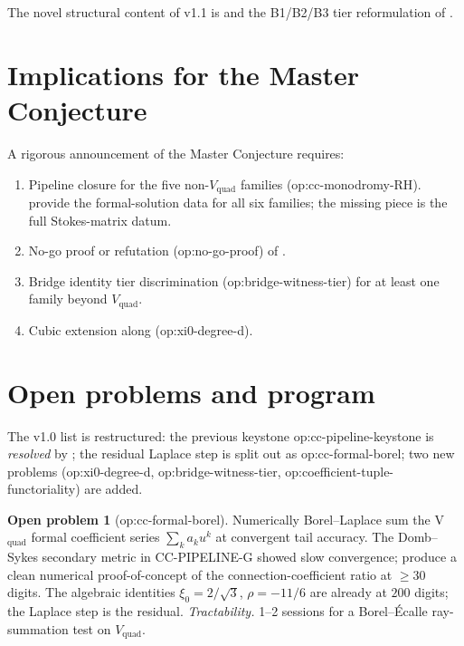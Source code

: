 \documentclass[11pt,reqno]{amsart}
\theoremstyle{plain}
\theoremstyle{definition}
\newtheorem{problem}[theorem]{Open problem}
\theoremstyle{remark}
\newcommand{\Vquad}{V_{\mathrm{quad}}}
\begin{document}
The novel structural content of v1.1 is
 and the
B1/B2/B3 tier reformulation of .

\section{Implications for the Master Conjecture}
\label{sec:implications}

A rigorous announcement of the Master Conjecture requires:
\begin{enumerate}
\item Pipeline closure for the five non-$\Vquad$ families
(\textsf{op:cc-monodromy-RH}). 
provide the formal-solution data for all six families;
the missing piece is the full Stokes-matrix datum.
\item No-go proof or refutation (\textsf{op:no-go-proof})
of .
\item Bridge identity tier discrimination
(\textsf{op:bridge-witness-tier}) for at least one family
beyond $\Vquad$.
\item Cubic extension along
\cite{siarc_pcf2_v11, siarc_pcf2_program}
(\textsf{op:xi0-degree-d}).
\end{enumerate}

\section{Open problems and program}
\label{sec:open}

The v1.0 list is restructured: the previous keystone
\textsf{op:cc-pipeline-keystone} is \emph{resolved} by
; the residual Laplace step is split out
as \textsf{op:cc-formal-borel}; two new problems
(\textsf{op:xi0-degree-d}, \textsf{op:bridge-witness-tier},
\textsf{op:coefficient-tuple-functoriality}) are added.

\begin{problem}[\textsf{op:cc-formal-borel}]
Numerically Borel--Laplace sum the V$_\mathrm{quad}$
formal coefficient series $\sum_k a_k u^k$ at convergent
tail accuracy. The Domb--Sykes secondary metric in
CC-PIPELINE-G \cite{siarc_cc_pipeline_g} showed slow
convergence; produce a clean numerical proof-of-concept of
the connection-coefficient ratio at $\ge 30$ digits. The
algebraic identities $\xi_0 = 2/\sqrt 3$, $\rho = -11/6$
are already at $200$ digits; the Laplace step is the residual.
\emph{Tractability.} 1--2 sessions for a Borel--\'Ecalle
ray-summation test on $\Vquad$.
\end{problem}
\end{document}
